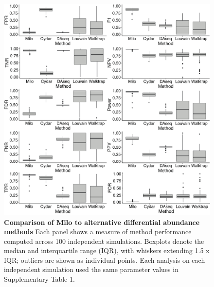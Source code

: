 \documentclass[
]{article}
\begin{document}
\begin{figure}
\centering
\includegraphics{suppl_figs/suppl_fig5.pdf}
\caption{\label{fig:sup-fig-5}\textbf{Comparison of Milo to alternative differential abundance methods}
Each panel shows a measure of method performance computed across 100 independent simulations. Boxplots denote the median and interquartile range (IQR), with whiskers extending 1.5 x IQR; outliers are shown as individual points. Each analysis on each independent simulation used the same parameter values in Supplementary Table 1.}
\end{figure}
\end{document}
